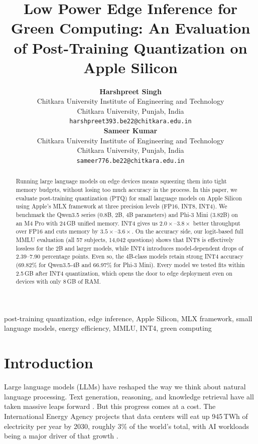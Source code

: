\documentclass[journal]{IEEEtran}
\title{Low Power Edge Inference for Green Computing: An Evaluation of Post-Training Quantization on Apple Silicon}
\author{%
\begin{minipage}[t]{0.47\linewidth}
  \centering
  {\normalsize\bfseries Harshpreet Singh}\\[3pt]
  \small Chitkara University Institute of Engineering and Technology\\
  \small Chitkara University, Punjab, India\\
  \small\texttt{harshpreet393.be22@chitkara.edu.in}
\end{minipage}%
\hfill%
\begin{minipage}[t]{0.47\linewidth}
  \centering
  {\normalsize\bfseries Sameer Kumar}\\[3pt]
  \small Chitkara University Institute of Engineering and Technology\\
  \small Chitkara University, Punjab, India\\
  \small\texttt{sameer776.be22@chitkara.edu.in}
\end{minipage}%
}
\begin{document}
\maketitle

\begin{abstract}
Running large language models on edge devices means squeezing them into tight memory budgets, without losing too much accuracy in the process. In this paper, we evaluate post-training quantization (PTQ) for small language models on Apple Silicon using Apple's MLX framework at three precision levels (FP16, INT8, INT4). We benchmark the Qwen3.5 series (0.8B, 2B, 4B parameters) and Phi-3 Mini (3.82B) on an M4 Pro with 24\,GB unified memory. INT4 gives us $2.0\times$--$3.8\times$ better throughput over FP16 and cuts memory by $3.5\times$--$3.6\times$. On the accuracy side, our logit-based full MMLU evaluation (all 57 subjects, 14,042 questions) shows that INT8 is effectively lossless for the 2B and larger models, while INT4 introduces model-dependent drops of 2.39--7.90 percentage points. Even so, the 4B-class models retain strong INT4 accuracy (69.82\% for Qwen3.5-4B and 66.97\% for Phi-3 Mini). Every model we tested fits within 2.5\,GB after INT4 quantization, which opens the door to edge deployment even on devices with only 8\,GB of RAM.
\end{abstract}

\begin{IEEEkeywords}
post-training quantization, edge inference, Apple Silicon, MLX framework, small language models, energy efficiency, MMLU, INT4, green computing
\end{IEEEkeywords}

\section{Introduction}

Large language models (LLMs) have reshaped the way we think about natural language processing. Text generation, reasoning, and knowledge retrieval have all taken massive leaps forward \cite{brown2020language, openai2023gpt4}. But this progress comes at a cost. The International Energy Agency projects that data centers will eat up 945\,TWh of electricity per year by 2030, roughly 3\% of the world's total, with AI workloads being a major driver of that growth \cite{iea2025energyai}.
\end{document}
